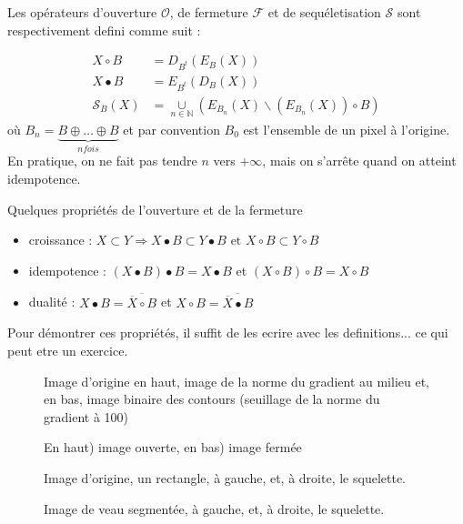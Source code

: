 \documentclass[10pt,a4paper]{article}
\begin{document}
Les op\'{e}rateurs d'ouverture $\mathcal{O}$, de fermeture $\mathcal{F}$ et de sequ\'{e}letisation $\mathcal{S}$ sont respectivement defini comme suit : 

\begin{align*}	
	X\circ B &=  D_{B^t}\left(E_{B}\left(X\right)\right) \\
	X\bullet B &= E_{B^t}\left(D_{B}\left(X\right)\right) \\
	\mathcal{S}_{B}\left(X\right) &= \underset{n\in \mathbb{N}}{\cup} \left(E_{B_n}\left(X\right) \backslash \left(E_{B_n}\left(X\right)\right)\circ B \right)
\end{align*}
o\`{u} $B_n =\underset{n fois}{\underbrace{B\oplus\ldots\oplus B}}$ et par convention $B_0$ est l'ensemble de un pixel \`{a} l'origine. En pratique, on ne fait pas tendre $n$ vers $+\infty$, mais on s'arr\^{e}te quand on atteint idempotence.

Quelques propri\'{e}t\'{e}s de l'ouverture et de la fermeture
\begin{itemize}
	\item croissance : $X\subset Y \Rightarrow X\bullet B \subset Y\bullet B \text{ et } X\circ B \subset Y\circ B$
	\item idempotence : $\left( X\bullet B \right) \bullet B = X\bullet B $ et $\left( X \circ B \right) \circ B = X\circ B $
	\item dualit\'{e} : $ X\bullet B = \overline{ \overline{X}\circ B}$ et $ X\circ B = \overline{ \overline{X}\bullet B}$
\end{itemize}

Pour d\'{e}montrer ces propri\'{e}t\'{e}s, il suffit de les ecrire avec les definitions... ce qui peut etre un exercice.


\begin{figure}[h]
\hspace{-0.2\textwidth}
	\caption{Image d'origine en haut, image de la norme du gradient au milieu et, en bas, image binaire des contours (seuillage de la norme du gradient \`{a} 100)}
	\label{piece}
\end{figure}

\begin{figure}[h]
\hspace{-0.2\textwidth}
\caption{En haut) image ouverte, en bas) image ferm\'{e}e}
\label{pieceOF}
\end{figure}

\begin{figure}[h]
\hspace{-0.2\textwidth}
\vspace{-40mm}
	\caption{Image d'origine, un rectangle, \`{a} gauche, et, \`{a} droite, le squelette.}
	\label{rectSkel}
\end{figure}
\begin{figure}[h]
\hspace{-0.2\textwidth}
\vspace{-40mm}
	\caption{Image de veau segment\'{e}e, \`{a} gauche, et, \`{a} droite, le squelette.}
	\label{rectSkel}
\end{figure}
\end{document}
